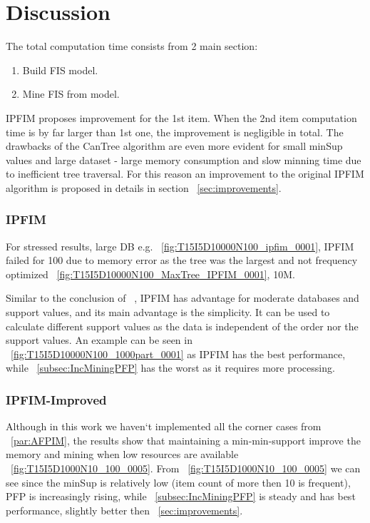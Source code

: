 

\section{Discussion}
\label{sec:discussion}

The total computation time consists from 2 main section:
\begin{enumerate}
\item Build FIS model. \label{item:disc1}
\item Mine FIS from model.\label{item:disc2}
\end{enumerate}

IPFIM proposes improvement for the 1st item. When the 2nd item computation time is by far larger than 1st one, the improvement is negligible in total. The drawbacks of the CanTree algorithm are even more evident for small minSup values and large dataset - large memory consumption and slow minning time due to inefficient tree traversal. For this reason an improvement to the original IPFIM algorithm is proposed in details in section ~\autoref{sec:improvements}.

\subsubsection{IPFIM}
For stressed results, large DB e.g. ~\autoref{fig:T15I5D10000N100_ipfim_0001}, IPFIM failed for 100 due to memory error as the tree was the largest and not frequency optimized  ~\autoref{fig:T15I5D10000N100_MaxTree_IPFIM_0001}, 10M. 

Similar to the conclusion of ~\cite{song2017}, IPFIM has advantage for moderate databases and support values, and its main advantage is the simplicity. It can be used to calculate different support values as the data is independent of the order nor the support values. An example can be seen in ~\autoref{fig:T15I5D10000N100_1000part_0001} as IPFIM has the best performance, while ~\autoref{subsec:IncMiningPFP} has the worst as it requires more processing.

\subsubsection{IPFIM-Improved}
Although in this work we haven`t implemented all the corner cases from ~\autoref{par:AFPIM}, the results show that maintaining a min-min-support improve the memory and mining when low resources are available ~\autoref{fig:T15I5D1000N10_100_0005}. From ~\autoref{fig:T15I5D1000N10_100_0005} we can see since the minSup is relatively low (item count of more then 10 is frequent), PFP is increasingly rising, while ~\autoref{subsec:IncMiningPFP} is steady and has best performance, slightly better then ~\autoref{sec:improvements}.



